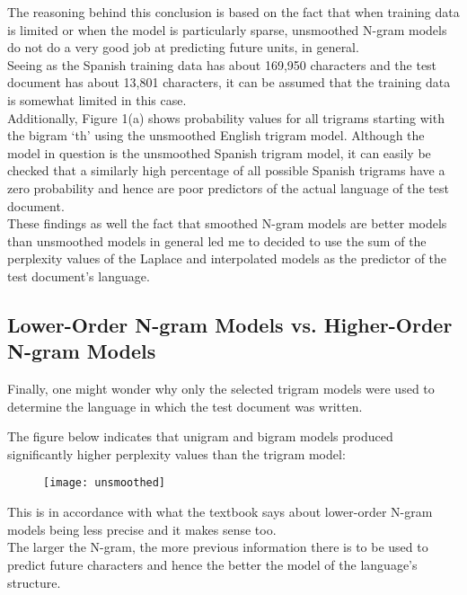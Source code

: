 \documentclass[a4,10pt]{article}
\begin{document}
The reasoning behind this conclusion is based on the fact that when training data is limited or when the model is particularly sparse, unsmoothed N-gram models do not do a very good job at predicting future units, in general.  \\

Seeing as the Spanish training data has about 169,950 characters and the test document has about 13,801 characters, it can be assumed that the training data is somewhat limited in this case.\\

Additionally, Figure 1(a) shows probability values for all trigrams starting with the bigram `th' using the unsmoothed English trigram model.  Although the model in question is the unsmoothed Spanish trigram model, it can easily be checked that a similarly high percentage of all possible Spanish trigrams have a zero probability and hence are poor predictors of the actual language of the test document. \\

These findings as well the fact that smoothed N-gram models are better models than unsmoothed models in general led me to decided to use the sum of the perplexity values of the Laplace and interpolated models as the predictor of the test document's language.   

\subsection{Lower-Order N-gram Models vs. Higher-Order N-gram Models}

Finally, one might wonder why only the selected trigram models were used to determine the language in which the test document was written. \\

\newpage

The figure below indicates that unigram and bigram models produced significantly higher perplexity values than the trigram model: 

\begin{figure}[hb]
  \centering
  \texttt{[image: unsmoothed]}
\end{figure}

This is in accordance with what the textbook says about lower-order N-gram models being less precise and it makes sense too. \\

The larger the N-gram, the more previous information there is to be used to predict future characters and hence the better the model of the language's structure.  \\
\end{document}
